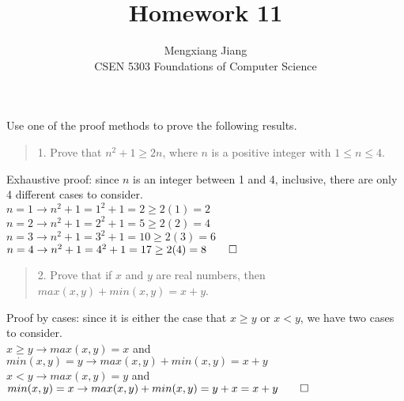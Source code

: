 \documentclass[12pt]{article}
\newenvironment{problem}[2][Problem]{\begin{trivlist}
\item[\hskip \labelsep {\bfseries #1}\hskip \labelsep {\bfseries #2.}]}{\end{trivlist}}
\begin{document}
 
 
\title{Homework 11}%
\author{Mengxiang Jiang\\ %
CSEN 5303 Foundations of Computer Science} %
 
\maketitle

\begin{problem}{1}
    Use one of the proof methods to prove the following results. 
\begin{quote}
    1. Prove that $n^2 + 1 \geq 2n$, where $n$ is a positive integer with $1 \leq n \leq 4$.
\end{quote}
Exhaustive proof: since $n$ is an integer between 1 and 4, inclusive, there are only 4 different cases to consider.\\
$n=1 \rightarrow n^2 + 1 = 1^2 + 1 = 2 \geq 2(1) = 2$\\
$n=2 \rightarrow n^2 + 1 = 2^2 + 1 = 5 \geq 2(2) = 4$\\
$n=3 \rightarrow n^2 + 1 = 3^2 + 1 = 10 \geq 2(3) = 6$\\
$n=4 \rightarrow n^2 + 1 = 4^2 + 1 = 17 \geq 2(4) = 8 \qed$
\begin{quote}
    2. Prove that if $x$ and $y$ are real numbers, then $max(x, y) + min(x, y) = x + y$.
\end{quote}
Proof by cases: since it is either the case that $x \geq y$ or $x < y$, we have two cases to consider.\\
$x \geq y \rightarrow max(x, y) = x$ and $min(x, y) = y \rightarrow max(x,y)+min(x,y) = x + y$\\
$x < y \rightarrow max(x,y) = y$ and $min(x, y) = x \rightarrow max(x,y) + min(x,y) = y + x = x + y\qed$\\
\end{problem}
\end{document}
